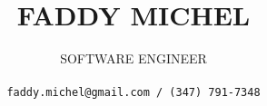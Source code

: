 \title{\uppercase{Faddy Michel}}

\author{\uppercase{Software Engineer}\\ \\
\texttt{faddy.michel@gmail.com / (347) 791-7348}
}

\date{}

\maketitle
